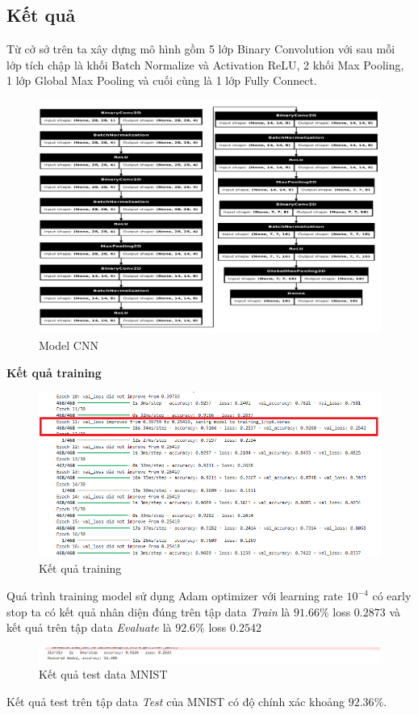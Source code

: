 \subsection{Kết quả}
Từ cở sở trên ta xây dựng mô hình gồm 5 lớp Binary Convolution với sau mỗi lớp tích chập là khối Batch Normalize và Activation ReLU, 2 khối Max Pooling, 1 lớp Global Max Pooling và cuối cùng là 1 lớp Fully Connect.
\begin{figure}[H]
    \centering
    \includegraphics[width=1\linewidth]{Images/image.png}
    \caption{Model CNN}
    \label{fig:enter-label}
\end{figure}

\textbf{Kết quả training}
\begin{figure}[H]
    \centering
    \includegraphics[width=0.9\linewidth]{Images/training.png}
    \caption{Kết quả training}
    \label{fig:enter-label}
\end{figure}
Quá trình training model sử dụng Adam optimizer với learning rate $10^{-4}$ có early stop ta có kết quả nhân diện đúng trên tập data \textit{Train} là $91.66\%$ loss $0.2873$ và kết quả trên tập data \textit{Evaluate} là $92.6\%$ loss $0.2542$
\begin{figure}[H]
    \centering
    \includegraphics[width=0.9\linewidth]{Images/traintest.png}
    \caption{Kết quả test data MNIST}
    \label{fig:mnisttest}
\end{figure}
Kết quả test trên tập data \textit{Test} của MNIST có độ chính xác khoảng $92.36\%$.